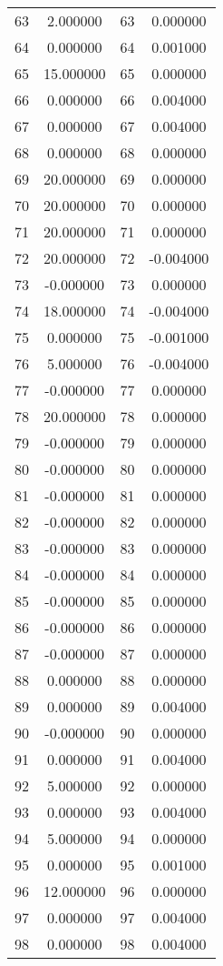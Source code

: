 \documentclass[12pt]{article}
\begin{document}
\begin{longtable}{@{}cccc@{}}
63 & 2.000000 & 63 & 0.000000 \\
64 & 0.000000 & 64 & 0.001000 \\
65 & 15.000000 & 65 & 0.000000 \\
66 & 0.000000 & 66 & 0.004000 \\
67 & 0.000000 & 67 & 0.004000 \\
68 & 0.000000 & 68 & 0.000000 \\
69 & 20.000000 & 69 & 0.000000 \\
70 & 20.000000 & 70 & 0.000000 \\
71 & 20.000000 & 71 & 0.000000 \\
72 & 20.000000 & 72 & -0.004000 \\
73 & -0.000000 & 73 & 0.000000 \\
74 & 18.000000 & 74 & -0.004000 \\
75 & 0.000000 & 75 & -0.001000 \\
76 & 5.000000 & 76 & -0.004000 \\
77 & -0.000000 & 77 & 0.000000 \\
78 & 20.000000 & 78 & 0.000000 \\
79 & -0.000000 & 79 & 0.000000 \\
80 & -0.000000 & 80 & 0.000000 \\
81 & -0.000000 & 81 & 0.000000 \\
82 & -0.000000 & 82 & 0.000000 \\
83 & -0.000000 & 83 & 0.000000 \\
84 & -0.000000 & 84 & 0.000000 \\
85 & -0.000000 & 85 & 0.000000 \\
86 & -0.000000 & 86 & 0.000000 \\
87 & -0.000000 & 87 & 0.000000 \\
88 & 0.000000 & 88 & 0.000000 \\
89 & 0.000000 & 89 & 0.004000 \\
90 & -0.000000 & 90 & 0.000000 \\
91 & 0.000000 & 91 & 0.004000 \\
92 & 5.000000 & 92 & 0.000000 \\
93 & 0.000000 & 93 & 0.004000 \\
94 & 5.000000 & 94 & 0.000000 \\
95 & 0.000000 & 95 & 0.001000 \\
96 & 12.000000 & 96 & 0.000000 \\
97 & 0.000000 & 97 & 0.004000 \\
98 & 0.000000 & 98 & 0.004000 \\

\end{longtable}
\end{document}

